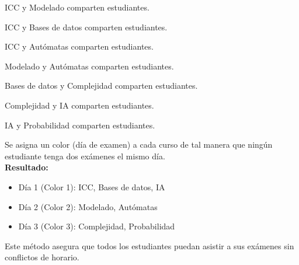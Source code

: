 \begin{myitemize}
    \item ICC y Modelado comparten estudiantes.
    \item ICC y Bases de datos comparten estudiantes.
    \item ICC y Autómatas comparten estudiantes.
    \item Modelado y Autómatas comparten estudiantes.
    \item Bases de datos y Complejidad comparten estudiantes.
    \item Complejidad y IA comparten estudiantes.
    \item IA y Probabilidad comparten estudiantes.
\end{myitemize}

Se asigna un color (día de examen) a cada curso de tal manera que ningún estudiante tenga dos exámenes el mismo día.\\ 


\textbf{Resultado:}
\begin{itemize}
    \item[] Día 1 (Color 1): ICC, Bases de datos, IA
    \item[] Día 2 (Color 2): Modelado, Autómatas
    \item[] Día 3 (Color 3): Complejidad, Probabilidad
\end{itemize}

\noindent Este método asegura que todos los estudiantes puedan asistir a sus exámenes sin conflictos de horario.